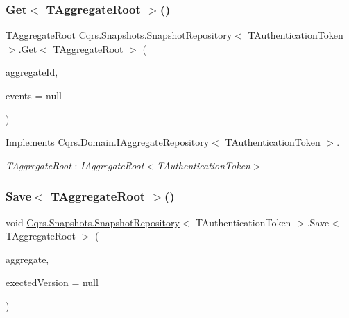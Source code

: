 \subsubsection{\texorpdfstring{Get$<$ T\+Aggregate\+Root $>$()}{Get< TAggregateRoot >()}}
{\footnotesize\ttfamily T\+Aggregate\+Root \hyperlink{classCqrs_1_1Snapshots_1_1SnapshotRepository}{Cqrs.\+Snapshots.\+Snapshot\+Repository}$<$ T\+Authentication\+Token $>$.Get$<$ T\+Aggregate\+Root $>$ (\begin{DoxyParamCaption}\item[{Guid}]{aggregate\+Id,  }\item[{I\+List$<$ \hyperlink{interfaceCqrs_1_1Events_1_1IEvent}{I\+Event}$<$ T\+Authentication\+Token $>$$>$}]{events = {\ttfamily null} }\end{DoxyParamCaption})}



Implements \hyperlink{interfaceCqrs_1_1Domain_1_1IAggregateRepository_a890633fddbd05bd3b9e9968a2de095bb}{Cqrs.\+Domain.\+I\+Aggregate\+Repository$<$ T\+Authentication\+Token $>$}.

\begin{Desc}
\item[Type Constraints]\begin{description}
\item[{\em T\+Aggregate\+Root} : {\em I\+Aggregate\+Root$<$T\+Authentication\+Token$>$}]\end{description}
\end{Desc}
\mbox{\label{classCqrs_1_1Snapshots_1_1SnapshotRepository_a4a7484e7754cae876f0c04e640eb80ff}} 
\subsubsection{\texorpdfstring{Save$<$ T\+Aggregate\+Root $>$()}{Save< TAggregateRoot >()}}
{\footnotesize\ttfamily void \hyperlink{classCqrs_1_1Snapshots_1_1SnapshotRepository}{Cqrs.\+Snapshots.\+Snapshot\+Repository}$<$ T\+Authentication\+Token $>$.Save$<$ T\+Aggregate\+Root $>$ (\begin{DoxyParamCaption}\item[{T\+Aggregate\+Root}]{aggregate,  }\item[{int?}]{exected\+Version = {\ttfamily null} }\end{DoxyParamCaption})}



